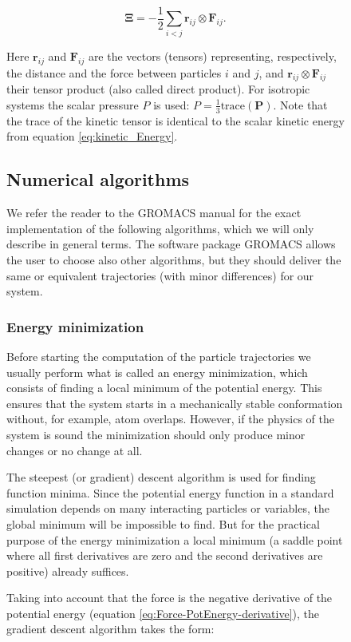 \begin{center}
\begin{figure}[H]
\begin{minipage}[t]{0.55\columnwidth}
\begin{equation}
\mathbf{\Xi}=-\frac{1}{2}\sum_{i<j}\mathbf{r}_{ij}\otimes\mathbf{F}_{ij}.\label{eq:virial-theorem}
\end{equation}

Here $\mathbf{r}_{ij}$ and $\mathbf{F}_{ij}$ are the vectors (tensors)
representing, respectively, the distance and the force between particles
$i$ and $j$, and $\mathbf{r}_{ij}\otimes\mathbf{F}_{ij}$ their
tensor product (also called direct product). For isotropic systems
the scalar pressure $P$ is used: $P=\frac{1}{3}\textrm{trace}(\mathbf{P})$.
Note that the trace of the kinetic tensor is identical to the scalar
kinetic energy from equation \ref{eq:kinetic_Energy}.

\subsection{Numerical algorithms}

We refer the reader to the GROMACS manual \cite{d.-van-der-spoel:2010}
for the exact implementation of the following algorithms, which we
will only describe in general terms. The software package GROMACS
allows the user to choose also other algorithms, but they should deliver
the same or equivalent trajectories (with minor differences) for our
system.

\subsubsection{Energy minimization}

Before starting the computation of the particle trajectories we usually
perform what is called an energy minimization, which consists of finding
a local minimum of the potential energy. This ensures that the system
starts in a mechanically stable conformation without, for example,
atom overlaps. However, if the physics of the system is sound the
minimization should only produce minor changes or no change at all.

The steepest (or gradient) descent algorithm is used for finding function
minima. Since the potential energy function in a standard simulation
depends on many interacting particles or variables, the global minimum
will be impossible to find. But for the practical purpose of the energy
minimization a local minimum (a saddle point where all first derivatives
are zero and the second derivatives are positive) already suffices.

Taking into account that the force is the negative derivative of the
potential energy (equation \ref{eq:Force-PotEnergy-derivative}),
the gradient descent algorithm takes the form:


\end{minipage}
\end{figure}
\end{center}
